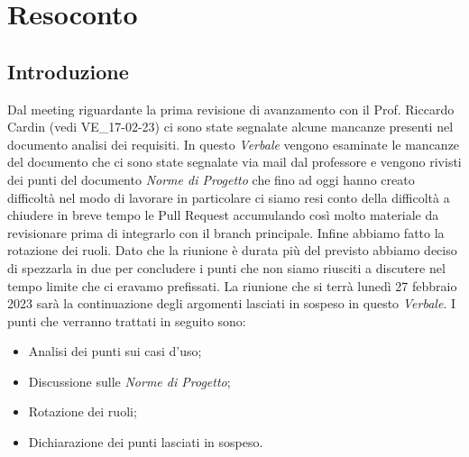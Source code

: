 \section{Resoconto}
\subsection{Introduzione}

Dal meeting riguardante la prima revisione di avanzamento con il Prof. Riccardo Cardin (vedi VE\_17-02-23) ci sono state segnalate 
alcune mancanze presenti nel documento analisi dei requisiti.
In questo \textit{Verbale} vengono esaminate le mancanze del documento che ci sono state segnalate via mail dal professore e vengono rivisti dei punti del documento \textit{Norme di Progetto}
che fino ad oggi hanno creato difficoltà nel modo di lavorare in particolare ci siamo resi conto della difficoltà a chiudere in breve tempo le Pull Request
accumulando così molto materiale da revisionare prima di integrarlo con il branch principale.
Infine abbiamo fatto la rotazione dei ruoli.
 Dato che la riunione è durata più del previsto abbiamo deciso di spezzarla in due per concludere i punti che non siamo riusciti a discutere nel tempo limite che ci eravamo prefissati.
La riunione che si terrà lunedì 27 febbraio 2023 sarà la continuazione degli argomenti lasciati in sospeso in questo \textit{Verbale}.
I punti che verranno trattati in seguito sono:
\begin{itemize}
    \item Analisi dei punti sui casi d'uso;
    \item Discussione sulle \textit{Norme di Progetto};
    \item Rotazione dei ruoli;
    \item Dichiarazione dei punti lasciati in sospeso.
\end{itemize}

